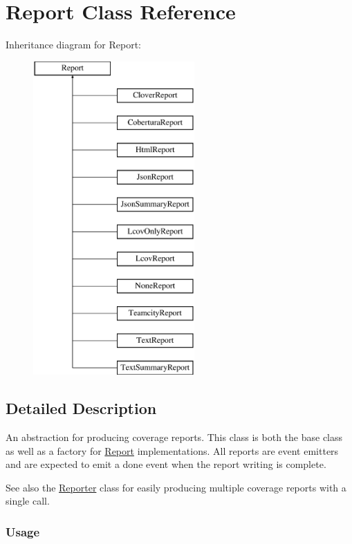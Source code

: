\hypertarget{class_report}{}\section{Report Class Reference}
\label{class_report}
Inheritance diagram for Report\+:\begin{figure}[H]
\begin{center}
\leavevmode
\includegraphics[height=12.000000cm]{class_report}
\end{center}
\end{figure}


\subsection{Detailed Description}
An abstraction for producing coverage reports. This class is both the base class as well as a factory for {\ttfamily \hyperlink{class_report}{Report}} implementations. All reports are event emitters and are expected to emit a {\ttfamily done} event when the report writing is complete.

See also the {\ttfamily \hyperlink{class_reporter}{Reporter}} class for easily producing multiple coverage reports with a single call.

\subsubsection*{Usage }

